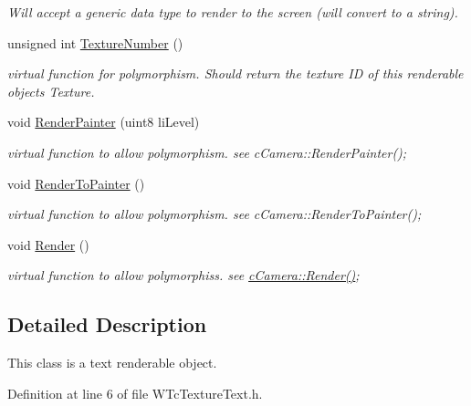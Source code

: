 \begin{DoxyCompactItemize}
\begin{DoxyCompactList}\small\item\em Will accept a generic data type to render to the screen (will convert to a string). \item\end{DoxyCompactList}\item 
unsigned int \hyperlink{classc_text_ab10f62a2c5c568ab197a928d565e3da4}{TextureNumber} ()
\begin{DoxyCompactList}\small\item\em virtual function for polymorphism. Should return the texture ID of this renderable objects Texture. \item\end{DoxyCompactList}\item 
void \hyperlink{classc_text_a527fc91fc0c3e5a2b0a7fb366321ef8b}{RenderPainter} (uint8 liLevel)
\begin{DoxyCompactList}\small\item\em virtual function to allow polymorphism. see cCamera::RenderPainter(); \item\end{DoxyCompactList}\item 
void \hyperlink{classc_text_add728aeca513f1c355b933a77038162a}{RenderToPainter} ()
\begin{DoxyCompactList}\small\item\em virtual function to allow polymorphism. see cCamera::RenderToPainter(); \item\end{DoxyCompactList}\item 
void \hyperlink{classc_text_ad331a52b579e01af3b3151e1fc2b52fd}{Render} ()
\begin{DoxyCompactList}\small\item\em virtual function to allow polymorphiss. see \hyperlink{classc_camera_acfe96d0953540fa3938e4d415d7cb791}{cCamera::Render()}; \item\end{DoxyCompactList}\end{DoxyCompactItemize}


\subsection{Detailed Description}
This class is a text renderable object. 

Definition at line 6 of file WTcTextureText.h.



